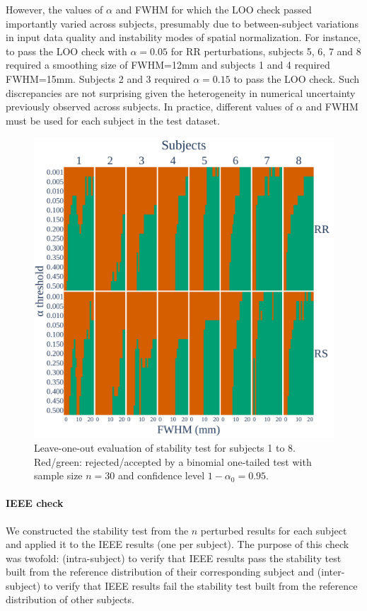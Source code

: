 \documentclass[lettersize,journal]{IEEEtran}
\begin{document}
However, the values of $\alpha$ and FWHM for which the LOO check passed importantly varied across subjects, presumably due to between-subject variations in input data quality and instability modes of spatial normalization. For instance, to pass the LOO check with $\alpha=0.05$ for RR perturbations, subjects 5, 6, 7 and 8 required a smoothing size of FWHM=12mm and subjects 1 and 4 required FWHM=15mm. Subjects 2 and 3 required $\alpha=0.15$ to pass the LOO check. Such discrepancies are not surprising given the heterogeneity in numerical uncertainty previously observed across subjects. In practice, different values of $\alpha$ and FWHM must be used for each subject in the test dataset.

\begin{figure}
    \centering
    \includegraphics[width=\linewidth]{figures/loo_fwe_bonferroni.pdf}
    \caption{Leave-one-out evaluation of stability test for subjects 1 to 8.
        Red/green: rejected/accepted by a binomial one-tailed test with sample size $n=30$ and confidence level $1-\alpha_0=0.95$.}
    \label{fig:loo_bonferroni}
\end{figure}


\paragraph{IEEE check} We constructed the stability test from the $n$ perturbed results for each subject and applied it to the IEEE results (one per subject). The purpose of this check was twofold: (intra-subject) to verify that IEEE results pass the stability test built from the reference distribution of their corresponding subject and (inter-subject) to verify that IEEE results fail the stability test built from the reference distribution of other subjects.
\end{document}
